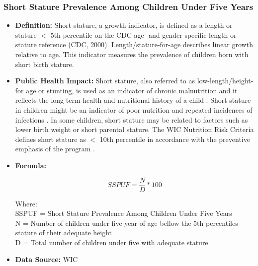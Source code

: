 \documentclass[12pt,letterpaper]{report}
\begin{document}
\subsubsection{Short Stature Prevalence Among Children Under Five Years} 
	\begin{itemize}
		\item \textbf{Definition:} Short stature, a growth indicator, is defined as a length or stature $<$ 5th percentile on the CDC age- and gender-specific length or stature reference (CDC, 2000). Length/stature-for-age describes linear growth relative to age. This indicator measures the prevalence of children born with short birth stature. 
		
		\item \textbf{Public Health Impact:}  Short stature, also referred to as low-length/height-for age or stunting, is used as an indicator of chronic malnutrition and it reflects the long-term health and nutritional history of a child \cite{world1995physical}. Short stature in children might be an indicator of poor nutrition and repeated incidences of infections \cite{black2008maternal} \cite{uauy2008nutrition} \cite{stephenson1994helminth} \cite{oberhelman1998correlations} \cite{stephenson2000malnutrition}. In some children, short stature may be related to factors such as lower birth weight or short parental stature. The WIC Nutrition Risk Criteria defines short stature as $<$ 10th percentile in accordance with the preventive emphasis of the program \cite{national1996WIC}.
		
				\item \textbf{Formula:} 
		
			\begin{equation} 
		SSPUF = \frac{N}{D} *100	
			\end{equation} 

Where: \\
	SSPUF = Short Stature Prevalence Among Children Under Five Years\\
			
			N = Number of children under five year of age bellow the 5th percentiles stature of their adequate height\\
			
			D = Total number of children under five with adequate stature\\
		\item \textbf{Data Source:} WIC
	\end{itemize}

\end{document}
